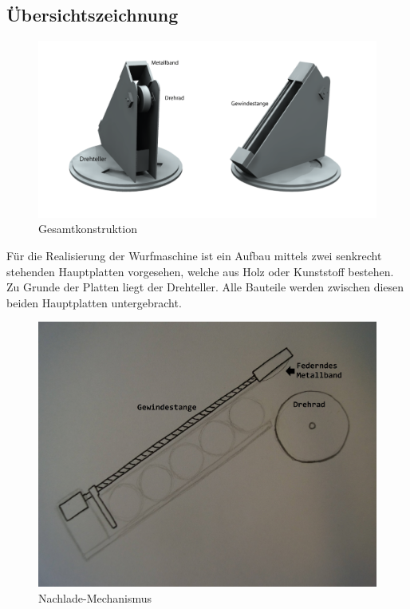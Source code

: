 \subsection{Übersichtszeichnung}

\begin{figure}[h!]
	\centering
	\includegraphics[scale=0.5]{../../fig/StudioLegende.png}
	\caption{Gesamtkonstruktion}
\end{figure}

Für die Realisierung der Wurfmaschine ist ein Aufbau mittels zwei senkrecht stehenden Hauptplatten vorgesehen, welche aus Holz oder Kunststoff bestehen. Zu Grunde der Platten liegt der Drehteller. Alle Bauteile werden zwischen diesen beiden Hauptplatten untergebracht.

\newpage

\begin{figure}[h!]
	\centering
	\includegraphics[scale=0.35]{../../fig/Ballnachlader.jpg}
	\caption{Nachlade-Mechanismus}
	\label{fig:nachlade-machanismus}
\end{figure}

